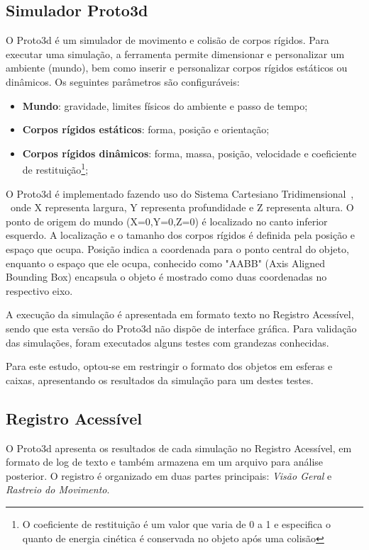 \documentclass[12pt]{article}
\begin{document}
\subsection{Simulador Proto3d}
O Proto3d é um simulador de movimento e colisão de corpos rígidos. Para executar uma simulação, a ferramenta permite dimensionar e personalizar um ambiente (mundo), bem como inserir e personalizar corpos rígidos estáticos ou dinâmicos. Os seguintes parâmetros são configuráveis:
\begin{itemize}
	\item \textbf{Mundo}: gravidade, limites físicos do ambiente e passo de tempo;
	\item \textbf{Corpos rígidos estáticos}: forma, posição e orientação;
	\item \textbf{Corpos rígidos dinâmicos}: forma, massa, posição, velocidade e coeficiente de restituição\footnote{O coeficiente de restituição é um valor que varia de 0 a 1 e especifica o quanto de energia cinética é conservada no objeto após uma colisão};
\end{itemize}

O Proto3d é implementado fazendo uso do Sistema Cartesiano Tridimensional~\cite{thibaut2004proyecto}, ~onde X representa largura, Y representa profundidade e Z representa altura. O ponto de origem do mundo (X=0,Y=0,Z=0) é localizado no canto inferior esquerdo. A localização e o tamanho dos corpos rígidos é definida pela posição e espaço que ocupa. Posição indica a coordenada para o ponto central do objeto, enquanto o espaço que ele ocupa, conhecido como "AABB" (Axis Aligned Bounding Box) encapsula o objeto é mostrado como duas coordenadas no respectivo eixo.

A execução da simulação é apresentada em formato texto no Registro Acessível, sendo que esta versão do Proto3d não dispõe de interface gráfica. Para validação das simulações, foram executados alguns testes com grandezas conhecidas. 

Para este estudo, optou-se em restringir o formato dos objetos em esferas e caixas, apresentando os resultados da simulação para um destes testes.

\subsection{Registro Acessível}
O Proto3d apresenta os resultados de cada simulação no Registro Acessível, em formato de log de texto e também armazena em um arquivo para análise posterior. O registro é organizado em duas partes principais: \emph{Visão Geral} e \emph{Rastreio do Movimento}.
\end{document}
